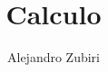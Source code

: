 \documentclass{report}
\author{Alejandro Zubiri}
\title{Calculo}
\begin{document}
\maketitle
\tableofcontents
\pagebreak





\end{document}
